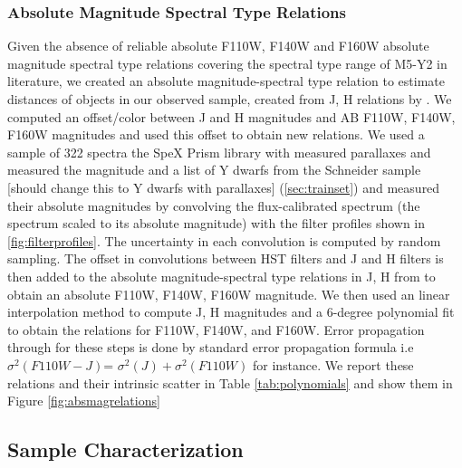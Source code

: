 \documentclass[manuscript]{aastex63}
\begin{document}
\subsubsection{ Absolute Magnitude  Spectral Type Relations }\label{sec:absmags}
Given the absence of reliable absolute F110W, F140W and  F160W absolute magnitude spectral type relations covering the spectral type range of M5-Y2 in literature, we created an absolute magnitude-spectral type relation to estimate distances of objects in our observed sample, created from J, H relations by \cite{Pecaut2013}. We computed an offset/color between J and H magnitudes and AB F110W, F140W, F160W magnitudes and used this offset to obtain new relations. We used a sample of 322 spectra the SpeX Prism library with measured parallaxes and measured the magnitude and a list of Y dwarfs from the Schneider sample [should change this to Y dwarfs with parallaxes] (\ref{sec:trainset}) and measured their absolute magnitudes by convolving  the flux-calibrated spectrum (the spectrum scaled to its absolute magnitude) with the filter profiles shown in \ref{fig:filterprofiles}.  The uncertainty in each convolution is computed by random sampling. The offset in convolutions between HST filters and J and H filters is then added to the absolute magnitude-spectral type relations in J, H from \cite{Pecaut2013} to obtain an absolute F110W, F140W, F160W magnitude. We then used an linear interpolation method to compute J, H magnitudes and a 6-degree polynomial fit to obtain the relations for F110W, F140W, and F160W.  Error propagation through for these steps is done by standard error propagation formula i.e $\sigma ^2 (F110W-J)$= $\sigma ^2 (J) + \sigma ^2 (F110W)$ for instance. We report these relations and their intrinsic scatter in Table \ref{tab:polynomials} and show them in Figure \ref{fig:absmagrelations}


\subsection{Sample Characterization}\label{sec:results}
\end{document}
